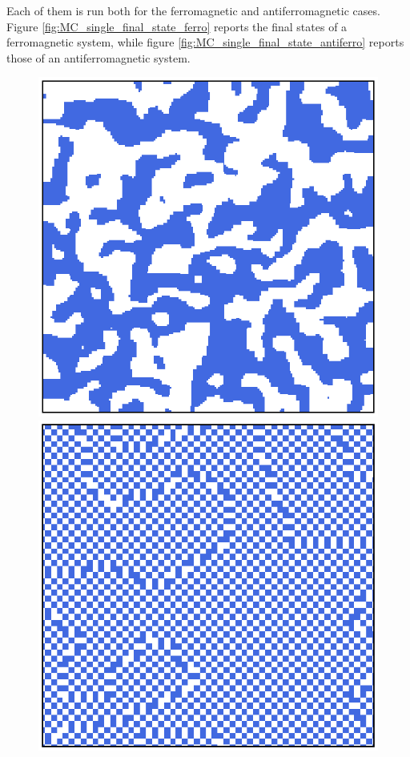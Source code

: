 Each of them is run both for the ferromagnetic and antiferromagnetic cases. \\
Figure \ref{fig:MC_single_final_state_ferro} reports the final states of a ferromagnetic system, while
figure \ref{fig:MC_single_final_state_antiferro} reports those of an antiferromagnetic system.\\
\begin{figure}[h]
    \centering 
    \hfill\begin{minipage}[t]{0.45\textwidth}
        \centering
        \includegraphics[scale=0.45]{./images/ising/T_001_ferro.eps}
    \end{minipage}%
    \hfill
    \begin{minipage}[t]{0.45\textwidth}
        \centering
        \includegraphics[scale=0.45]{./images/ising/T_n001_ferro.eps}

\end{minipage}
\end{figure}
